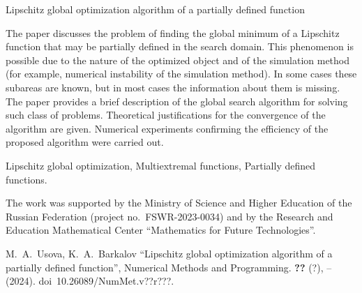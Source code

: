 \documentclass[10pt,a4paper]{book}
\begin{document}
    {Lipschitz global optimization algorithm \break
    of a partially defined function}
    
    {The paper discusses the problem of finding the global minimum of a Lipschitz function that may be partially defined in the search domain. This phenomenon is possible due to the nature of the optimized object and of the simulation method (for example, numerical instability of the simulation method). In some cases these subareas are known, but in most cases the information about them is missing. The paper provides a brief description of the global search algorithm for solving such class of problems. Theoretical justifications for the convergence of the algorithm are given. Numerical experiments confirming the efficiency of the proposed algorithm were carried out.}

        {Lipschitz global optimization, 
        Multiextremal functions, 
        Partially defined functions.}

    {The work was supported by the Ministry of Science and Higher Education of the Russian Federation (project no.~FSWR-2023-0034) and by the Research and Education Mathematical Center ``Mathematics for Future Technologies''.}

    {M.~A.~Usova, K.~A.~Barkalov
    ``Lipschitz global optimization algorithm
    of a partially defined function'',
    Numerical Methods and Programming. \textbf{??} (?), 
    \pageref*{firstPage}--\pageref*{LastPage} (2024).
    doi~10.26089/NumMet.v??r???.}
\end{document}
